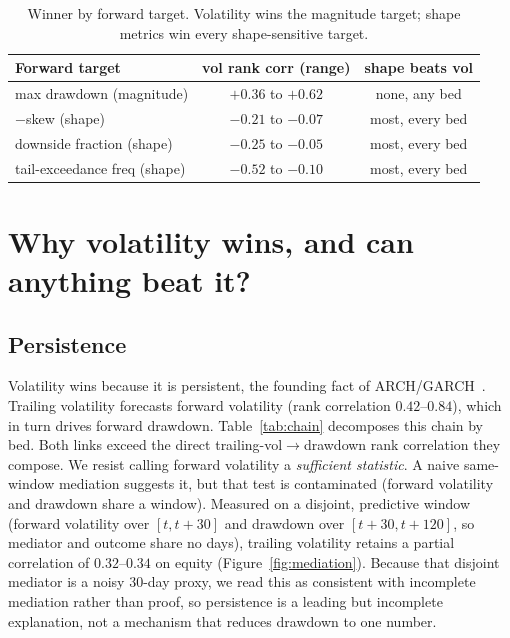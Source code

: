 \documentclass[sigconf,anonymous,nonacm]{acmart}
\begin{document}
\begin{table}[t]
\centering
\small
\caption{Winner by forward target. Volatility wins the magnitude target; shape metrics
win every shape-sensitive target.}
\label{tab:target}
\begin{tabular}{lcc}
\toprule
Forward target & vol rank corr (range) & shape beats vol \\
\midrule
max drawdown (magnitude) & $+0.36$ to $+0.62$ & none, any bed \\
$-$skew (shape) & $-0.21$ to $-0.07$ & most, every bed \\
downside fraction (shape) & $-0.25$ to $-0.05$ & most, every bed \\
tail-exceedance freq (shape) & $-0.52$ to $-0.10$ & most, every bed \\
\bottomrule
\end{tabular}
\end{table}

\section{Why volatility wins, and can anything beat it?}\label{sec:why}
\subsection{Persistence}
Volatility wins because it is persistent, the founding
fact of ARCH/GARCH~\cite{engle1982,bollerslev1986}. Trailing volatility forecasts
forward volatility (rank correlation $0.42$--$0.84$), which in turn drives forward
drawdown. Table~\ref{tab:chain} decomposes this chain by bed. Both links exceed the
direct trailing-vol$\rightarrow$drawdown rank correlation they compose. We resist
calling forward volatility a
\emph{sufficient statistic}. A naive same-window mediation suggests it, but that test
is contaminated (forward volatility and drawdown share a window). Measured on a
disjoint, predictive window (forward volatility over $[t,t{+}30]$ and drawdown over
$[t{+}30,t{+}120]$, so mediator and outcome share no days), trailing volatility retains a
partial correlation of $0.32$--$0.34$ on equity (Figure~\ref{fig:mediation}). Because that disjoint mediator is
a noisy $30$-day proxy, we read this as consistent with incomplete mediation rather than
proof, so persistence is a leading but incomplete explanation, not a mechanism that
reduces drawdown to one number.
\end{document}
